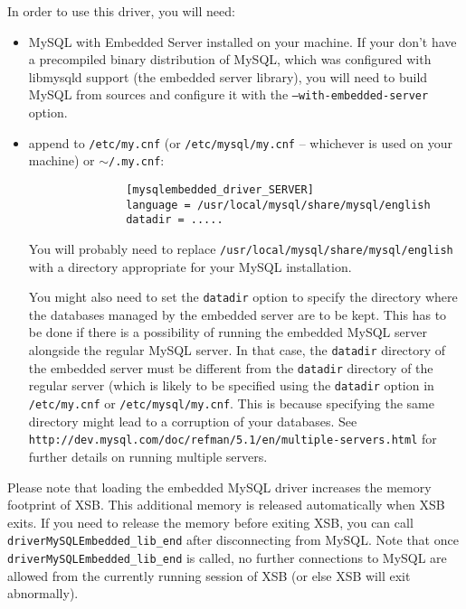 \noindent
In order to use this driver, you will need:
\begin{itemize}
 \item MySQL with Embedded Server installed on your machine. If your don't
 have a precompiled binary distribution of MySQL, which was configured with
 libmysqld support (the embedded server library), you will need to build
 MySQL from sources and configure it with the {\tt --with-embedded-server} option.

 \item append to {\tt /etc/my.cnf} (or {\tt /etc/mysql/my.cnf} -- whichever
   is used on your machine) or $\sim${\tt/.my.cnf}:
       \begin{verbatim}
               [mysqlembedded_driver_SERVER]
               language = /usr/local/mysql/share/mysql/english
               datadir = ..... 
       \end{verbatim}
       You will probably need to replace
       {\tt /usr/local/mysql/share/mysql/english} with a directory
       appropriate for your MySQL installation.

       You might also need to set the {\tt datadir} option to specify
       the directory where the databases managed by the embedded server are
       to be kept. This has to be done if there is a possibility of running
       the embedded MySQL server alongside the regular MySQL server. In
       that case, the {\tt datadir} directory of the embedded server must
       be different from the {\tt datadir} directory of the regular server
       (which is likely to be specified using the {\tt datadir} option in
       {\tt /etc/my.cnf} or {\tt /etc/mysql/my.cnf}. This is because
       specifying the same directory might lead to a corruption of your
       databases. See {\tt
         http://dev.mysql.com/doc/refman/5.1/en/multiple-servers.html} for
       further details on running multiple servers.
\end{itemize}

Please note that loading the embedded MySQL driver increases the memory
footprint of XSB. This additional memory is released automatically when XSB
exits. If you need to release the memory before exiting XSB, you can call {\tt
  driverMySQLEmbedded\_lib\_end} after disconnecting from MySQL.  Note
that once {\tt driverMySQLEmbedded\_lib\_end} is called, no further
connections to MySQL are allowed from the currently running session of XSB
(or else XSB will exit abnormally).



